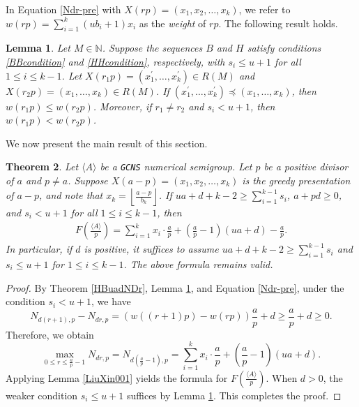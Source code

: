 \documentclass[reqno, 12pt]{article}
\newtheorem{thm}{Theorem}[section]
\newtheorem{lem}[thm]{Lemma}
\theoremstyle{mydefinition}
\theoremstyle{myremark}
\numberwithin{algorithm}{section}
\begin{document}
In Equation \eqref{Ndr-pre} with $X(rp)=(x_1,x_2,\ldots,x_k)$, we refer to $w(rp)=\sum_{i=1}^k(ub_i+1)x_i$ as the \emph{weight} of $rp$. The following result holds.

\begin{lem}{\em \cite[Lemma 2.11]{LiuSemigroupF}}\label{colex-incre}
Let $M\in \mathbb{N}$. Suppose the sequences $B$ and $H$ satisfy conditions \eqref{BBcondition} and \eqref{HHcondition}, respectively, with $s_i\leq u+1$ for all $1\leq i\leq k-1$. Let $X(r_1p)=(x_1^{\prime},\ldots,x_k^{\prime})\in R(M)$ and $X(r_2p)=(x_1,\ldots,x_k)\in R(M)$. If $(x_1^{\prime},\ldots,x_k^{\prime})\preceq (x_1,\ldots,x_k)$, then $w(r_1p)\leq w(r_2p)$. Moreover, if $r_1\neq r_2$ and $s_i<u+1$, then $w(r_1p)<w(r_2p)$.
\end{lem}

We now present the main result of this section.

\begin{thm}\label{Quotient-FrobeniusN}
Let $\langle A\rangle$ be a \texttt{GCNS} numerical semigroup. Let $p$ be a positive divisor of $a$ and $p\neq a$.
Suppose $X(a-p)=(x_1,x_2,\ldots,x_k)$ is the greedy presentation of $a-p$, and note that $x_k=\left\lfloor \frac{a-p}{b_k}\right\rfloor$. If $ua+d+k-2\geq \sum_{i=1}^{k-1}s_i$, $a+pd\geq 0$, and $s_i< u+1$ for all $1\leq i\leq k-1$, then 
\begin{align*}
F\left(\frac{\langle A\rangle}{p}\right)=\sum_{i=1}^kx_i\cdot \frac{a}{p}+\left(\frac{a}{p}-1\right)(ua+d)-\frac{a}{p}.
\end{align*}
In particular, if $d$ is positive, it suffices to assume $ua+d+k-2\geq \sum_{i=1}^{k-1}s_i$ and $s_i\leq u+1$ for $1\leq i\leq k-1$. The above formula remains valid.
\end{thm}
\begin{proof}
By Theorem \ref{HBuadNDr}, Lemma \ref{colex-incre}, and Equation \eqref{Ndr-pre}, under the condition $s_i<u+1$, we have
$$N_{d(r+1),p}-N_{dr,p}=(w((r+1)p)-w(rp))\frac{a}{p}+d\geq \frac{a}{p}+d\geq0.$$
Therefore, we obtain
$$\max_{0\leq r\leq \frac{a}{p}-1} N_{dr,p}=N_{d(\frac{a}{p}-1),p}=\sum_{i=1}^kx_i\cdot \frac{a}{p}+\left(\frac{a}{p}-1\right)(ua+d).$$
Applying Lemma \ref{LiuXin001} yields the formula for $F\left( \frac{\langle A \rangle}{p} \right)$. When $d > 0$, the weaker condition $s_i \leq u + 1$ suffices by Lemma \ref{colex-incre}. This completes the proof.
\end{proof}
\end{document}
